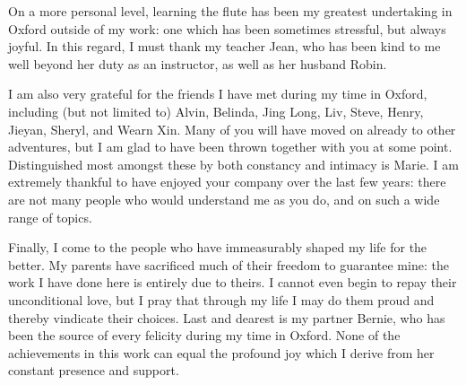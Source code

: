 On a more personal level, learning the flute has been my greatest undertaking in Oxford outside of my work: one which has been sometimes stressful, but always joyful.
In this regard, I must thank my teacher Jean, who has been kind to me well beyond her duty as an instructor, as well as her husband Robin.

I am also very grateful for the friends I have met during my time in Oxford, including (but not limited to) Alvin, Belinda, Jing Long, Liv, Steve, Henry, Jieyan, Sheryl, and Wearn Xin.
Many of you will have moved on already to other adventures, but I am glad to have been thrown together with you at some point.
Distinguished most amongst these by both constancy and intimacy is Marie.
I am extremely thankful to have enjoyed your company over the last few years: there are not many people who would understand me as you do, and on such a wide range of topics.

Finally, I come to the people who have immeasurably shaped my life for the better.
My parents have sacrificed much of their freedom to guarantee mine: the work I have done here is entirely due to theirs.
I cannot even begin to repay their unconditional love, but I pray that through my life I may do them proud and thereby vindicate their choices.
Last and dearest is my partner Bernie, who has been the source of every felicity during my time in Oxford.
None of the achievements in this work can equal the profound joy which I derive from her constant presence and support.
